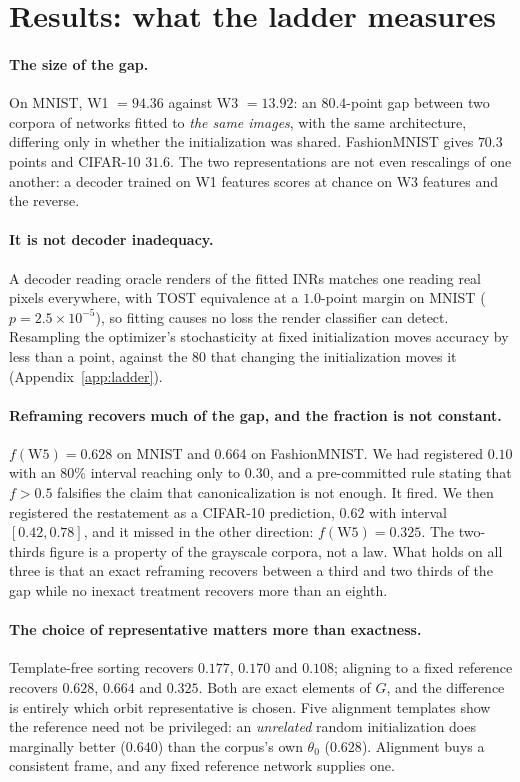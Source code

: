 \section{Results: what the ladder measures}\label{sec:results}

\paragraph{The size of the gap.} On MNIST, W1 $=94.36$ against W3 $=13.92$: an $80.4$-point gap
between two corpora of networks fitted to \emph{the same images}, with the same architecture,
differing only in whether the initialization was shared. FashionMNIST gives $70.3$ points and
CIFAR-10 $31.6$. The two representations are not even rescalings of one another: a decoder trained
on W1 features scores at chance on W3 features and the reverse.

\paragraph{It is not decoder inadequacy.} A decoder reading oracle renders of the fitted INRs
matches one reading real pixels everywhere, with TOST equivalence at a $1.0$-point margin on MNIST
($p = 2.5\times10^{-5}$), so fitting causes no loss the render classifier can detect. Resampling the optimizer's stochasticity at
fixed initialization moves accuracy by less than a point, against the $80$ that changing the
initialization moves it (Appendix~\ref{app:ladder}).

\paragraph{Reframing recovers much of the gap, and the fraction is not constant.}
$f(\mathrm{W5}) = 0.628$ on MNIST and $0.664$ on FashionMNIST. We had registered $0.10$ with an
$80\%$ interval reaching only to $0.30$, and a pre-committed rule stating that $f > 0.5$ falsifies
the claim that canonicalization is not enough. It fired. We then registered the restatement as a
CIFAR-10 prediction, $0.62$ with interval $[0.42,0.78]$, and it missed in the other direction:
$f(\mathrm{W5}) = 0.325$. The two-thirds figure is a property of the grayscale corpora, not a law.
What holds on all three is that an exact reframing recovers between a third and two thirds of the
gap while no inexact treatment recovers more than an eighth.

\paragraph{The choice of representative matters more than exactness.} Template-free sorting
recovers $0.177$, $0.170$ and $0.108$; aligning to a fixed reference recovers $0.628$, $0.664$ and
$0.325$. Both are exact elements of $G$, and the difference is entirely which orbit representative
is chosen. Five alignment templates show the reference need not be privileged: an \emph{unrelated}
random initialization does marginally better ($0.640$) than the corpus's own $\theta_0$ ($0.628$).
Alignment buys a consistent frame, and any fixed reference network supplies one.

